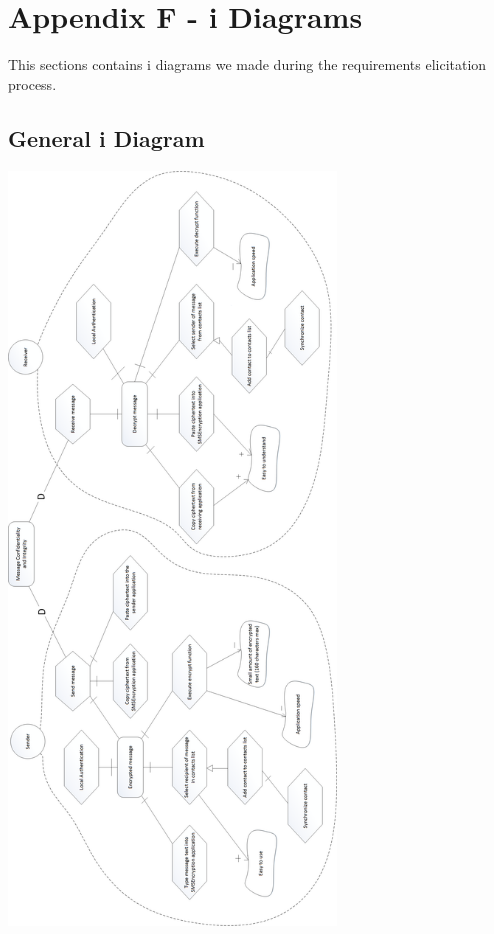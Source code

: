 \section{Appendix F - i\text{*} Diagrams}

This sections contains i\text{*} diagrams we made during the requirements elicitation process.

\subsection*{General i\text{*} Diagram}

\begin{center}
 \includegraphics[height=20cm]{diagrams/IStarDiagrams/SMSEncryptionIStarDiagram.png}
\end{center}


